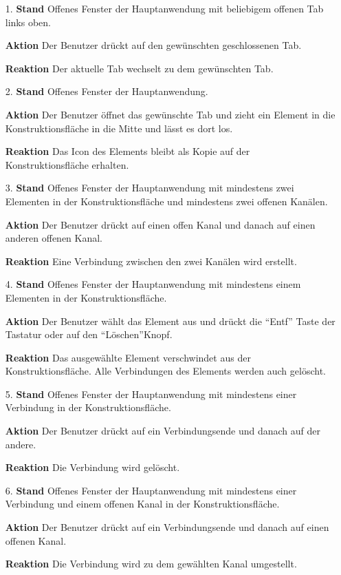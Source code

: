 \documentclass[parskip=full]{scrartcl}
\begin{document}
\begin{itemize}
\begin{itemize}
\item [1.]\textbf{Stand} Offenes Fenster der Hauptanwendung mit beliebigem offenen Tab links oben.
\item []\textbf{Aktion} Der Benutzer drückt auf den gewünschten geschlossenen Tab.
\item []\textbf{Reaktion} Der aktuelle Tab wechselt zu dem gewünschten Tab.

\item [2.]\textbf{Stand} Offenes Fenster der Hauptanwendung.
\item []\textbf{Aktion} Der Benutzer öffnet das gewünschte Tab und zieht ein Element in die Konstruktionsfläche in die Mitte und lässt es dort los.
\item []\textbf{Reaktion} Das Icon des Elements bleibt als Kopie auf der Konstruktionsfläche erhalten.

\item[3.]\textbf{ Stand} Offenes Fenster der Hauptanwendung mit mindestens zwei Elementen in der Konstruktionsfläche und mindestens zwei offenen Kanälen.
\item[]\textbf{Aktion} Der Benutzer drückt auf einen offen Kanal und danach auf einen anderen offenen Kanal.
\item[]\textbf{Reaktion} Eine Verbindung zwischen den zwei Kanälen wird erstellt.

\item[4.]\textbf{ Stand} Offenes Fenster der Hauptanwendung mit mindestens einem Elementen in der Konstruktionsfläche.
\item[]\textbf{Aktion} Der Benutzer wählt das Element aus und drückt die "`Entf"' Taste der Tastatur oder auf den "`Löschen"'Knopf.
\item[]\textbf{Reaktion} Das ausgewählte Element verschwindet aus der Konstruktionsfläche. Alle Verbindungen des Elements werden auch gelöscht.

\item[5.]\textbf{ Stand} Offenes Fenster der Hauptanwendung mit mindestens einer Verbindung in der Konstruktionsfläche.
\item[]\textbf{Aktion} Der Benutzer drückt auf ein Verbindungsende und danach auf der andere.
\item[]\textbf{Reaktion} Die Verbindung wird gelöscht.

\item[6.]\textbf{ Stand} Offenes Fenster der Hauptanwendung mit mindestens einer Verbindung und einem offenen Kanal in der Konstruktionsfläche.
\item[]\textbf{Aktion} Der Benutzer drückt auf ein Verbindungsende und danach auf einen offenen Kanal.
\item[]\textbf{Reaktion} Die Verbindung wird zu dem gewählten Kanal umgestellt.

\end{itemize}

\end{itemize}
\end{document}
